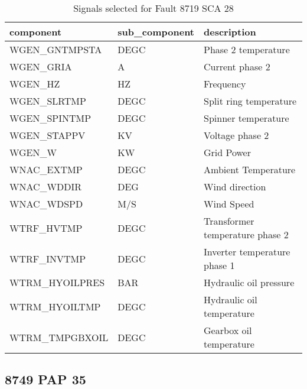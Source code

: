 \begin{table}[!ht]
    \centering
    \begin{tabular}{|l|l|l|}
    \hline
        component & sub\_component & description \\ \hline
        WGEN\_GNTMPSTA & DEGC & Phase 2 temperature \\ \hline
        WGEN\_GRIA & A & Current phase 2 \\ \hline
        WGEN\_HZ & HZ & Frequency \\ \hline
        WGEN\_SLRTMP & DEGC & Split ring temperature \\ \hline
        WGEN\_SPINTMP & DEGC & Spinner temperature \\ \hline
        WGEN\_STAPPV & KV & Voltage phase 2 \\ \hline
        WGEN\_W & KW & Grid Power \\ \hline
        WNAC\_EXTMP & DEGC & Ambient Temperature \\ \hline
        WNAC\_WDDIR & DEG & Wind direction \\ \hline
        WNAC\_WDSPD & M/S & Wind Speed \\ \hline
        WTRF\_HVTMP & DEGC & Transformer temperature phase 2 \\ \hline
        WTRF\_INVTMP & DEGC & Inverter temperature phase 1 \\ \hline
        WTRM\_HYOILPRES & BAR & Hydraulic oil pressure \\ \hline
        WTRM\_HYOILTMP & DEGC & Hydraulic oil temperature \\ \hline
        WTRM\_TMPGBXOIL & DEGC & Gearbox oil temperature \\ \hline
    \end{tabular}
    \caption{Signals selected for Fault 8719 SCA 28}
\end{table}

\subsection{8749 PAP 35}

